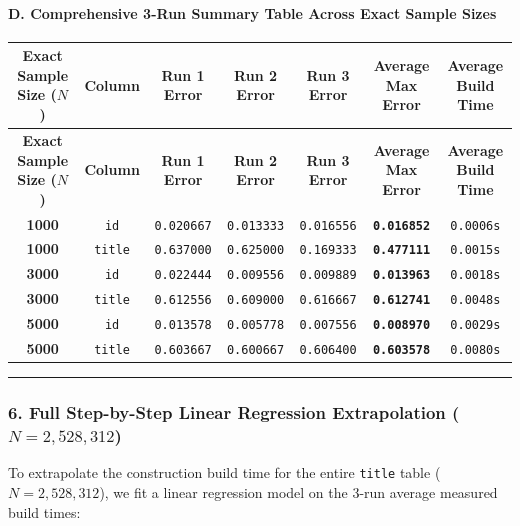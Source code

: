 \documentclass[11pt,a4paper]{article}
\begin{document}
\paragraph{D. Comprehensive 3-Run Summary Table Across Exact Sample Sizes}
{\begingroup
\footnotesize
\setlength{\tabcolsep}{3.5pt}
\begin{xltabular}{\textwidth}{C | C | C | C | C | C | C}
\toprule
\textbf{Exact Sample Size ($N$)} & \textbf{Column} & \textbf{Run 1 Error} & \textbf{Run 2 Error} & \textbf{Run 3 Error} & \textbf{\textbf{Average Max Error}} & \textbf{Average Build Time} \\
\midrule
\endfirsthead
\toprule
\textbf{Exact Sample Size ($N$)} & \textbf{Column} & \textbf{Run 1 Error} & \textbf{Run 2 Error} & \textbf{Run 3 Error} & \textbf{\textbf{Average Max Error}} & \textbf{Average Build Time} \\
\midrule
\endfirsthead
\endhead
\bottomrule
\endfoot
\bottomrule
\endlastfoot
\textbf{1000} & \texttt{id} & \texttt{0.020667} & \texttt{0.013333} & \texttt{0.016556} & \textbf{\texttt{0.016852}} & \texttt{0.0006s} \\
\textbf{1000} & \texttt{title} & \texttt{0.637000} & \texttt{0.625000} & \texttt{0.169333} & \textbf{\texttt{0.477111}} & \texttt{0.0015s} \\
\textbf{3000} & \texttt{id} & \texttt{0.022444} & \texttt{0.009556} & \texttt{0.009889} & \textbf{\texttt{0.013963}} & \texttt{0.0018s} \\
\textbf{3000} & \texttt{title} & \texttt{0.612556} & \texttt{0.609000} & \texttt{0.616667} & \textbf{\texttt{0.612741}} & \texttt{0.0048s} \\
\textbf{5000} & \texttt{id} & \texttt{0.013578} & \texttt{0.005778} & \texttt{0.007556} & \textbf{\texttt{0.008970}} & \texttt{0.0029s} \\
\textbf{5000} & \texttt{title} & \texttt{0.603667} & \texttt{0.600667} & \texttt{0.606400} & \textbf{\texttt{0.603578}} & \texttt{0.0080s} \\
\end{xltabular}
\endgroup}


\hrule


\subsubsection{6. Full Step-by-Step Linear Regression Extrapolation ($N = 2,528,312$)}

To extrapolate the construction build time for the entire \texttt{title} table ($N = 2,528,312$), we fit a linear regression model on the 3-run average measured build times:
\end{document}
